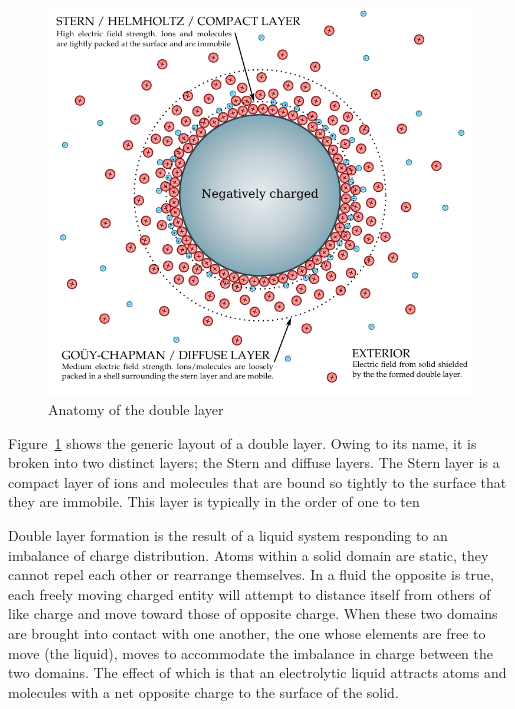     \begin{figure}
      \begin{center}
        \includegraphics{content/introduction/graphics/doubleLayer_labelled.pdf}
      \end{center}
      \caption{Anatomy of the double layer}
      \label{fig:doubleLayer_anatomy}
    \end{figure}

    Figure~\ref{fig:doubleLayer_anatomy} shows the generic layout of a double layer.
    Owing to its name, it is broken into two distinct layers; the Stern and diffuse layers.
    The Stern layer is a compact layer of ions and molecules that are bound so tightly to the surface that they are immobile.
    This layer is typically in the order of one to ten 

    Double layer formation is the result of a liquid system responding to an imbalance of charge distribution.
		Atoms within a solid domain are static, they cannot repel each other or rearrange themselves.
		In a fluid the opposite is true, each freely moving charged entity will attempt to distance itself from others of like charge and move toward those of opposite charge.
		When these two domains are brought into contact with one another, the one whose elements are free to move (the liquid), moves to accommodate the imbalance in charge between the two domains.
		The effect of which is that an electrolytic liquid attracts atoms and molecules with a net opposite charge to the surface of the solid.

